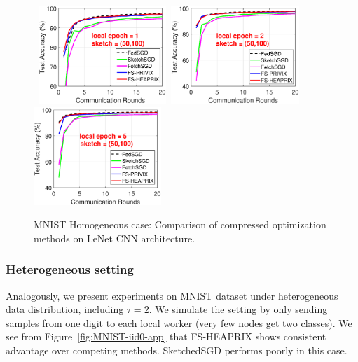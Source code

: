 \documentclass[sigconf, anonymous, review]{acmart}
\begin{document}
\begin{figure}[h]
\begin{center}
		\mbox{%
		\includegraphics[width=1.9in]{MNIST_figures/local1_sketch50_iid1_test_acc.eps}%
		\includegraphics[width=1.9in]{MNIST_figures/local2_sketch50_iid1_test_acc.eps} %
		\includegraphics[width=1.9in]{MNIST_figures/local5_sketch50_iid1_test_acc.eps}
		}
	\end{center}
	\caption{MNIST Homogeneous case: Comparison of compressed optimization methods on LeNet CNN architecture.}
    \label{fig:MNIST-iid1-app}
\end{figure}

\subsubsection{Heterogeneous setting}

Analogously, we present experiments on MNIST dataset under heterogeneous data distribution, including $\tau=2$. We simulate the setting by only sending samples from one digit to each local worker (very few nodes get two classes). We see from Figure~\ref{fig:MNIST-iid0-app} that FS-HEAPRIX shows consistent advantage over competing methods. SketchedSGD performs poorly in this case.
\end{document}
